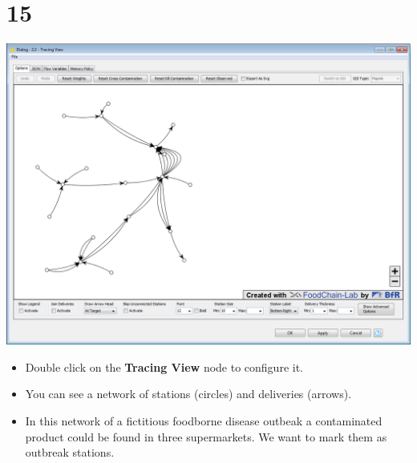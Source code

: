 \documentclass[10pt]{beamer}
\begin{document}
\section{15}
\begin{frame}
	\begin{center}
  		\includegraphics[height=0.6\textheight]{15.png}
	\end{center}
	\begin{itemize}
		\item Double click on the \textbf{Tracing View} node to configure it.
		\item You can see a network of stations (circles) and deliveries (arrows).
		\item In this network of a fictitious foodborne disease outbeak a contaminated product could be found in three supermarkets. We want to mark them as outbreak stations.
	\end{itemize}
\end{frame}
\end{document}
